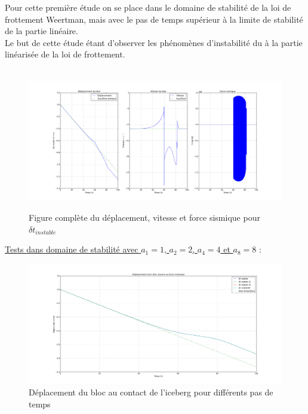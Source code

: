 \documentclass[11pt, a4paper]{article}
\begin{document}
Pour cette première étude on se place dans le domaine de stabilité de la loi de frottement Weertman, mais avec le pas de temps supérieur à la limite de stabilité de la partie linéaire. 
\\ Le but de cette étude étant d'observer les phénomènes d'instabilité du à la partie linéarisée de la loi de frottement. 
\\
\\
\begin{figure}[h!]
	\centering
	\includegraphics[width=1\linewidth]{figures/Part3/Subpart3/DeplaVitesFsisSubplotInsta.png}
	\label{SubplotDeplaVitesFsisInstaLinear}
	\caption{Figure complète du déplacement, vitesse et force sismique pour $\delta t_{instable}$}
\end{figure}
\underline{Tests dans domaine de stabilité avec $a_1=1$, $ a_2 = 2$, $a_4 = 4$ et $a_8 = 8$} :
\begin{figure}[h!]
	\centering
	\includegraphics[width=1\linewidth]{figures/Part3/Subpart3/Deplacement.png}
	\caption{Déplacement du bloc au contact de l'iceberg pour différents pas de temps}
	\label{UStableLinear}
\end{figure}
\end{document}
